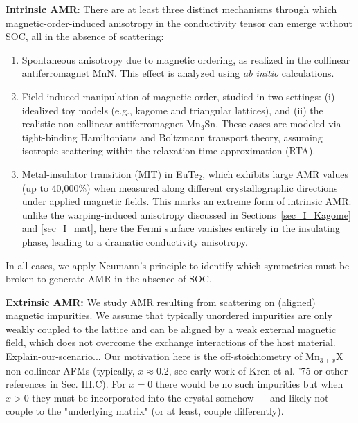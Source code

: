 \documentclass[prb,showpacs,amsmath,amssymb,superscriptaddress,twocolumn,floatfix]{revtex4-1}
\begin{document}
{\color{blue} 
	
\textbf{Intrinsic AMR}: There are at least three distinct mechanisms through which magnetic-order-induced anisotropy in the conductivity tensor can emerge without SOC, all in the absence of scattering:
	
\begin{enumerate}
	\item Spontaneous anisotropy due to magnetic ordering, as realized in the collinear antiferromagnet MnN. This effect is analyzed using \textit{ab initio} calculations.
	\item Field-induced manipulation of magnetic order, studied in two settings: (i) idealized toy models (e.g., kagome and triangular lattices), and (ii) the realistic non-collinear antiferromagnet Mn$_3$Sn. These cases are modeled via tight-binding Hamiltonians and Boltzmann transport theory, assuming isotropic scattering within the relaxation time approximation (RTA).
	\item Metal-insulator transition (MIT) in EuTe$_2$, which exhibits large AMR values (up to 40,000\%) when measured along different crystallographic directions under applied magnetic fields. This marks an extreme form of intrinsic AMR: unlike the warping-induced anisotropy discussed in Sections~\ref{sec_I_Kagome} and \ref{sec_I_mat}, here the Fermi surface vanishes entirely in the insulating phase, leading to a dramatic conductivity anisotropy.
\end{enumerate}
	
In all cases, we apply Neumann’s principle to identify which symmetries must be broken to generate AMR in the absence of SOC. \\}

\textbf{Extrinsic AMR:} We study AMR resulting from scattering on (aligned) magnetic impurities. We assume that typically unordered impurities are only weakly coupled to the lattice and can be aligned by a weak external magnetic field, which does not overcome the exchange interactions of the host material.	{\color{red}Explain-our-scenario...}
        Our motivation here is the off-stoichiometry of Mn$_{3+x}$X 
        non-collinear AFMs (typically, $x\approx 0.2$, see early work of 
Kren et al. '75
	or other references in Sec. III.C). For $x=0$ there would be no
        such impurities but when $x>0$ they must be incorporated into the
        crystal somehow --- and likely not couple to the "underlying matrix"
        (or at least, couple differently).\\
 
\end{document}
